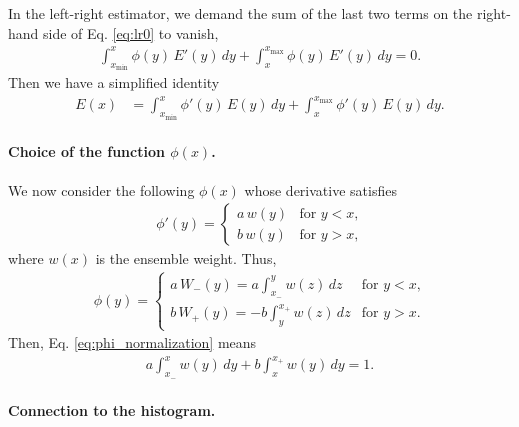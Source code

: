 \documentclass[12pt]{article}
\begin{document}
In the left-right estimator,
we demand the sum of the last two terms
on the right-hand side of Eq. \eqref{eq:lr0} to vanish,
\begin{align}
  \int_{x_{\min}}^x \phi(y) \, E'(y) \, dy
+
  \int_x^{x_{\max}} \phi(y) \, E'(y) \, dy
= 0.
\label{eq:lr1_constraint}
\end{align}
%
Then we have a simplified identity
\begin{align}
  E(x)
&=
  \int_{x_{\min}}^x \phi'(y) \, E(y) \, dy
  +
  \int_x^{x_{\max}} \phi'(y) \, E(y) \, dy.
\label{eq:lr1}
\end{align}



\paragraph{Choice of the function $\phi(x)$.}



We now consider the following $\phi(x)$
whose derivative satisfies
\begin{align}
  \phi'(y)
=
  \begin{cases}
    a \, w(y) &   \mbox{for $y < x$,} \\
    b \, w(y) &   \mbox{for $y > x$,}
  \end{cases}
\end{align}
where $w(x)$ is the ensemble weight.
%
Thus,
\begin{align}
  \phi(y)
=
  \begin{cases}
    a \, W_-(y) = a \int_{x_-}^y w(z) \, dz   &   \mbox{for $y < x$,} \\
    b \, W_+(y) = -b \int_y^{x_+} w(z) \, dz  &   \mbox{for $y > x$.}
  \end{cases}
  \label{eq:phi_W}
\end{align}
%
Then, Eq. \eqref{eq:phi_normalization} means
\begin{align}
  a \int_{x_-}^x w(y) \, dy
+
  b \int_{x}^{x_+} w(y) \, dy
=
  1.
  \label{eq:phi_normalization1}
\end{align}



\paragraph{Connection to the histogram.}
\end{document}
